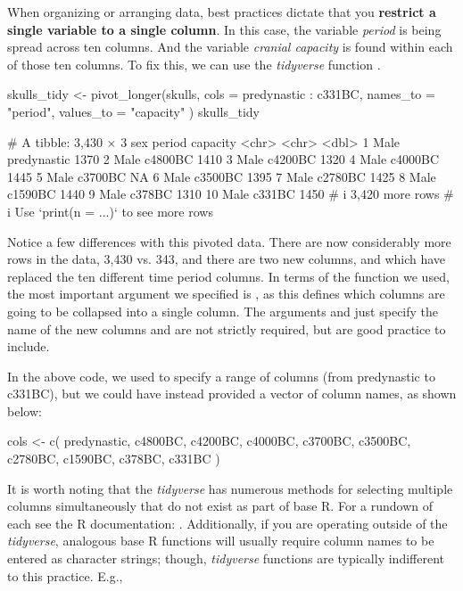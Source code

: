 When organizing or arranging data, best practices dictate that you \textbf{restrict a single variable to a single column}. In this case, the variable \textit{period} is being spread across ten columns. And the variable \textit{cranial capacity} is found within each of those ten columns. To fix this, we can use the \textit{tidyverse} function .

\begin{inR}
skulls_tidy <- pivot_longer(skulls,
  cols = predynastic : c331BC,
  names_to = "period",
  values_to = "capacity"
)
skulls_tidy
\end{inR}
\begin{outR}
# A tibble: 3,430 × 3
   sex   period      capacity
   <chr> <chr>          <dbl>
 1 Male  predynastic     1370
 2 Male  c4800BC         1410
 3 Male  c4200BC         1320
 4 Male  c4000BC         1445
 5 Male  c3700BC           NA
 6 Male  c3500BC         1395
 7 Male  c2780BC         1425
 8 Male  c1590BC         1440
 9 Male  c378BC          1310
10 Male  c331BC          1450
# i 3,420 more rows
# i Use `print(n = ...)` to see more rows
\end{outR}

Notice a few differences with this pivoted data. There are now considerably more rows in the data, 3,430 vs. 343, and there are two new columns,  and  which have replaced the ten different time period columns. In terms of the  function we used, the most important argument we specified is , as this defines which columns are going to be collapsed into a single column. The arguments  and  just specify the name of the new columns and are not strictly required, but are good practice to include.

In the above code, we used \R{:} to specify a range of columns (from predynastic to c331BC), but we could have instead provided a vector of column names, as shown below:

\begin{inR}
cols <- c(
  predynastic, c4800BC, c4200BC, c4000BC, c3700BC,
  c3500BC, c2780BC, c1590BC, c378BC, c331BC
)
\end{inR}
\vspace{1em}

\noindent It is worth noting that the \textit{tidyverse} has numerous methods for selecting multiple columns simultaneously that do not exist as part of base R. For a rundown of each see the R documentation: . Additionally, if you are operating outside of the \textit{tidyverse}, analogous base R functions will usually require column names to be entered as character strings; though, \textit{tidyverse} functions are typically indifferent to this practice. E.g.,

